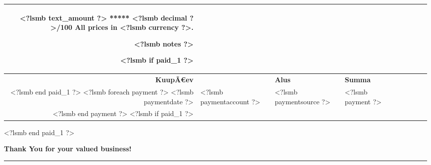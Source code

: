 \documentclass{scrartcl}
\begin{document}
\begin{tabularx}{\textwidth}{@{}rlXlrlrrr@{}}
{\vspace{0.3cm}

<?lsmb text_amount ?> ***** <?lsmb decimal ?>/100
\hfill
All prices in \textbf{<?lsmb currency ?>}.

\vspace{12pt}

<?lsmb notes ?>
}

\vfill

<?lsmb if paid_1 ?>
\begin{tabularx}{10cm}{@{}lXlr@{}}
  \textbf{Maksed} & & & \\
  \hline
  \textbf{KuupÃ€ev} & & \textbf{Alus} & \textbf{Summa} \\
<?lsmb end paid_1 ?>
<?lsmb foreach payment ?>
  <?lsmb paymentdate ?> & <?lsmb paymentaccount ?> & <?lsmb paymentsource ?> & <?lsmb payment ?> \\
<?lsmb end payment ?>
<?lsmb if paid_1 ?>
\end{tabularx}
<?lsmb end paid_1 ?>

\vspace{1cm}

\centerline{\textbf{Thank You for your valued business!}}

\rule{\textwidth}{0.5pt}

\usebox{\ftr}
\end{document}
